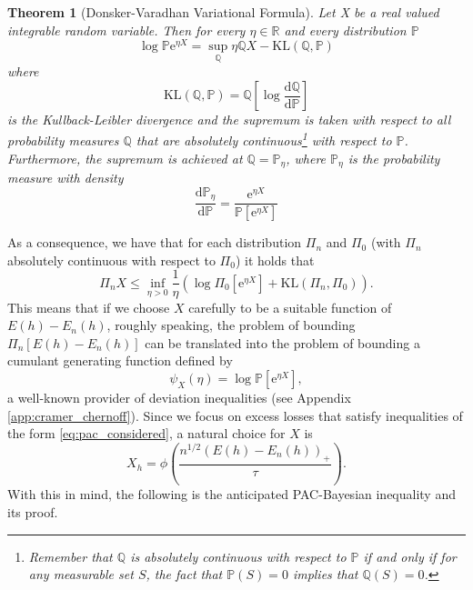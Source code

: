 \documentclass{uvamath}
\newcommand*{\reals}{\mathbb{R}}
\newcommand*{\bbP}{\mathbb{P}}
\newcommand*{\bbQ}{\mathbb{Q}}
\newcommand*{\sqbrack}[1]{\left[#1\right]}
\newcommand*{\paren}[1]{\left(#1\right)}
\newcommand*{\rme}{\mathrm{e}}
\newcommand*{\rmd}{\mathrm{d}}
\newcommand*{\KL}{\mathrm{KL}}
\newtheorem{theorem}{Theorem}[section]
\theoremstyle{remark}
\theoremstyle{definition}
\theoremstyle{definition}
\theoremstyle{definition}
\theoremstyle{definition}
\theoremstyle{definition}
\begin{document}
\begin{theorem}[Donsker-Varadhan Variational Formula]
  \label{thm:dv_formula}
  Let X be a real valued integrable random variable. Then for every
  $\eta\in\reals$ and every distribution $\bbP$
  \begin{equation}
    \log\bbP\rme^{\eta X} = \sup_{\bbQ}\eta\bbQ X - \KL(\bbQ, \bbP)
  \end{equation}
  where
  \begin{equation}\label{eq:def_kl}
    \KL(\bbQ, \bbP) = \bbQ\sqbrack{\log\frac{\rmd\bbQ}{\rmd\bbP}}
  \end{equation}
  is the Kullback-Leibler divergence and the supremum is taken with
  respect to all probability measures $\bbQ$ that are absolutely
  continuous\footnote{Remember that $\bbQ$ is absolutely continuous
    with respect to $\bbP$ if and only if for any measurable set $S$,
    the fact that $\bbP(S) = 0$ implies that $\bbQ(S)=0$.} with
  respect to $\bbP$.  Furthermore, the supremum is achieved at
  $\bbQ = \bbP_\eta$, where $\bbP_\eta$ is the probability measure
  with density
  \begin{equation*}
    \frac{\rmd \bbP_\eta}{\rmd \bbP} = \frac{\rme^{\eta
        X}}{\bbP[ \rme^{\eta X}]}
  \end{equation*}
\end{theorem}

As a consequence, we have that for each distribution $\Pi_n$ and
$\Pi_0$ (with $\Pi_n$ absolutely continuous with respect to $\Pi_0$)
it holds that
\begin{equation}\label{eq:kl_inequality}
  \Pi_n X \leq \inf_{\eta > 0} \frac{1}{\eta}(\log \Pi_0[\rme^{\eta X}] + \KL(\Pi_n, \Pi_0)).
\end{equation}
This means that if we choose $X$ carefully to be a suitable function
of $E(h) - E_n(h)$, roughly speaking, the problem of bounding
$\Pi_n[E(h) - E_n(h)]$ can be translated into the problem of bounding
a cumulant generating function defined by
\begin{equation}\label{eq:def_cumulant}
  \psi_X(\eta) = \log\bbP[\rme^{\eta X}],
\end{equation}
a well-known provider of deviation inequalities (see Appendix
\ref{app:cramer_chernoff}). Since we focus on excess losses that
satisfy inequalities of the form \eqref{eq:pac_considered}, a natural
choice for $X$ is
\begin{equation}\label{eq:x_h_definition}
  X_{h} = \phi\paren{\frac{n^{1/2}(E(h) - E_n(h))_+}{\tau}}.
\end{equation}
With this in mind, the following is the anticipated PAC-Bayesian
inequality and its proof.
\end{document}
